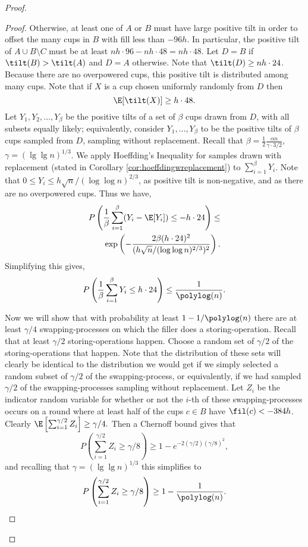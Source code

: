 \begin{proof}
\begin{proof}
  Otherwise, at least one of $A$ or $B$ must have large positive tilt in order
  to offset the many cups in $B$ with fill less than $-96h$. In particular, the
  positive tilt of $A \cup B \setminus C$ must be at least $nh\cdot 96 - nh\cdot 48 =
  nh\cdot 48$. Let $D=B$ if $\tilt(B) > \tilt(A)$ and $D=A$ otherwise. Note that
  $\tilt(D) \ge nh\cdot 24$. Because there are no overpowered cups, this positive
  tilt is distributed among many cups. Note that if $X$ is a cup chosen
  uniformly randomly from $D$ then $$\E[\tilt(X)] \ge h\cdot 48.$$ Let
  $Y_1,Y_2,\ldots, Y_\beta$ be the positive tilts of a set of $\beta$ cups
  drawn from $D$, with all subsets equally likely; equivalently, consider
  $Y_1,\ldots, Y_\beta$ to be the positive tilts of $\beta$ cups sampled from
  $D$, sampling without replacement. Recall that $\beta =
  \frac{1}{2}\frac{\alpha n}{\gamma\cdot 3/2}$, $\gamma = (\lg \lg n)^{1/3}$.
  We apply Hoeffding's Inequality for samples drawn with replacement (stated in
  Corollary \ref{cor:hoeffdingwreplacement}) to $\sum_{i=1}^\beta Y_i$. Note
  that $0\le Y_i \le h\sqrt{n}/(\log\log n)^{2/3}$, as positive tilt is
  non-negative, and as there are no overpowered cups. 
  Thus we have, 
  \begin{align*}
  P\left(\frac{1}{\beta} \sum_{i=1}^{\beta} (Y_i - \E[Y_i]) \le -h\cdot 24 \right) \le\\
  \exp\left(-\frac{2\beta(h\cdot 24)^2}{(h\sqrt{n}/(\log\log n)^{2/3})^2}\right).
  \end{align*}
  Simplifying this gives,
  $$P\left(\frac{1}{\beta}\sum_{i=1}^{\beta} Y_i \le h\cdot 24\right) \le \frac{1}{\polylog(n)}.$$

  Now we will show that with probability at least $1-1/\polylog(n)$ there are
  at least $\gamma/4$ swapping-processes on which the filler does a
  storing-operation.
  Recall that at least $\gamma/2$ storing-operations happen. Choose a random
  set of $\gamma/2$ of the storing-operations that happen. Note that the
  distribution of these sets will clearly be identical to the distribution we
  would get if we simply selected a random subset of $\gamma/2$ of the
  swapping-process, or equivalently, if we had sampled $\gamma/2$ of the
  swapping-processes sampling without replacement. Let $Z_i$ be the indicator
  random variable for whether or not the $i$-th of these swapping-processes occurs on a round
  where at least half of the cups $c \in B$ have $\fil(c) < -384h$.
  Clearly $\E\left[\sum_{i=1}^{\gamma/2} Z_i\right] \ge \gamma/4.$ 
  Then a Chernoff bound gives that
  $$P\left(\sum_{i=1}^{\gamma/2} Z_i \ge \gamma/8 \right) \ge 1-e^{-2(\gamma/2) (\gamma/8)^2},$$
  and recalling that $\gamma=(\lg\lg n)^{1/3}$ this simplifies to 
  $$P\left(\sum_{i=1}^{\gamma/2} Z_i \ge \gamma/8 \right) \ge 1-\frac{1}{\polylog(n)}.$$


\end{proof}
\end{proof}
